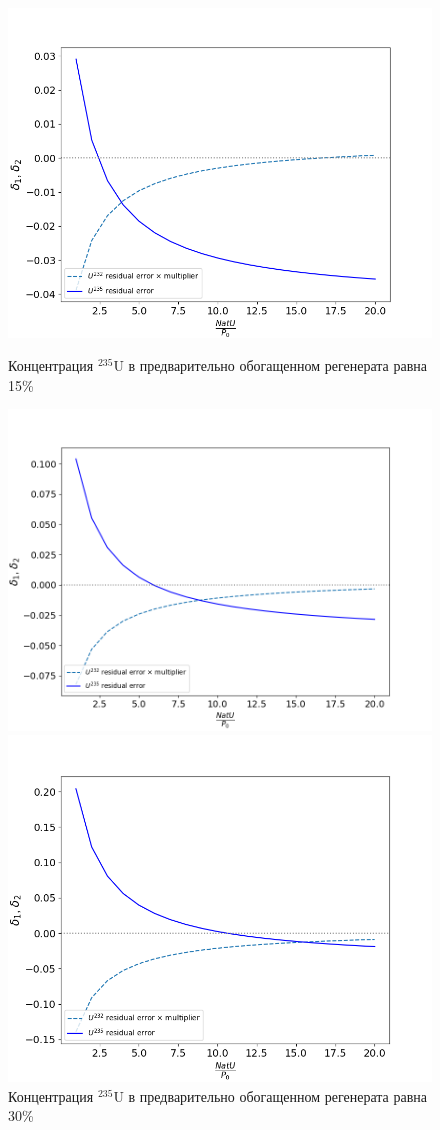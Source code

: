 \begin{figure}[ht]
  \begin{minipage}{.5\textwidth}
    \centering
    \includegraphics[width=.8\linewidth]{images/plots/15}  
    \caption{Концентрация $^{235}$U в предварительно обогащенном регенерата равна 15\%}
    \label{delta1}
  \end{minipage}
  \begin{minipage}{.5\textwidth}
    \centering
    \includegraphics[width=.8\linewidth]{images/plots/30}  
    \caption{Концентрация $^{235}$U в предварительно обогащенном регенерата равна 30\%}
    \label{delta2}
  \end{minipage}
  \begin{minipage}{.5\textwidth}
    \centering
    \includegraphics[width=.8\linewidth]{images/plots/50}  

\end{minipage}
\end{figure}
